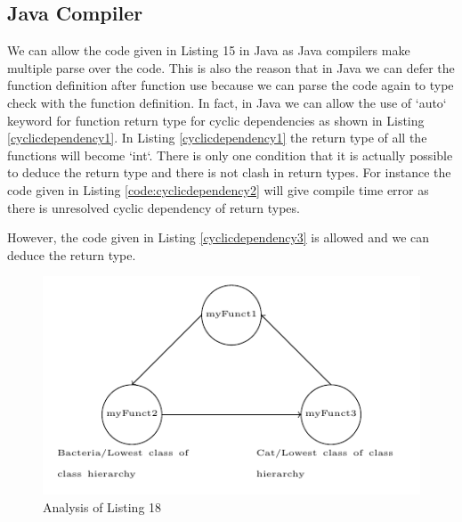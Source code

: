 \subsection{Java Compiler}
We can allow the code given in Listing 15 in Java as Java compilers make multiple parse over the code. This is also the reason that in Java we can defer the function definition after function use because we can parse the code again to type check with the function definition. 
In fact, in Java we can allow the use of `auto` keyword for function return type for cyclic dependencies as shown in Listing \ref{cyclicdependency1}. In Listing \ref{cyclicdependency1} the return type of all the functions will become `int`.
There is only one condition that it is actually possible to deduce the return type and there is not clash in return types. For instance the code given in Listing \ref{code:cyclicdependency2} will give compile time error as there is unresolved cyclic dependency of return types.

However, the code given in Listing \ref{cyclicdependency3} is allowed and we can deduce the return type. 

\begin{figure}
\centering
\includegraphics[width = 15cm]{diagram4.pdf}
\caption{Analysis of Listing 18}
\end{figure}